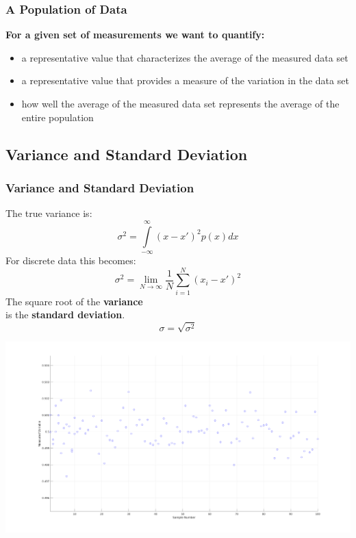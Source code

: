 \documentclass[fleqn]{beamer} %
\newcommand{\sectionIIsubsectionItitle}{A Population of Data}
\newcommand{\sectionIIsubsectionIItitle}{Variance and Standard Deviation}
\begin{document}
		    \begin{frame}[label=sectionIIsubsectionI]
				\frametitle{\sectionIIsubsectionItitle}

				\textbf{For a given set of measurements we want to quantify:}
				\begin{itemize}
					\item a representative value that characterizes the average of the measured data set
					\item a representative value that provides a measure of the variation in the data set
					\item how well the average of the measured data set represents the average of the entire population
				\end{itemize}

			\end{frame}	

		\subsection{\sectionIIsubsectionIItitle}\label{sectionIIsubsectionII}

			\begin{frame}
				\frametitle{\sectionIIsubsectionIItitle}

				\begin{multicols}{2} \tiny
				The true variance is:\\
				\[ \sigma^2=\int\limits_{-\infty}^{\infty}(x-x')^2p(x)dx \]
				For discrete data this becomes:\\
				\[ \sigma^2=\lim\limits_{N\rightarrow \infty}\frac{1}{N}\sum\limits_{i=1}^{N}(x_i-x')^2 \]
				The square root of the {\bf \BL variance} \\
				is the {\bf \PR standard deviation}. \\
				\[\sigma=\sqrt{\sigma^2}\]

				\hspace*{-1.5cm}\includegraphics[scale=.20]{images/topic2_measured_fig2.png}		
				
				\end{multicols}

			\end{frame}
\end{document}
